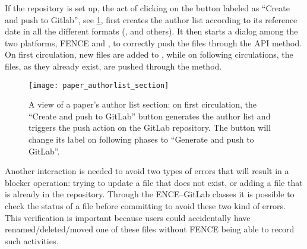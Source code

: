 If the repository is set up, the act of clicking on the button labeled as \enquote{Create and push to Gitlab}, see \cref{fig:paper_authorlist_section},
first creates the author list according to its reference date in all the different formats (,  and others).
It then starts a dialog among the two platforms, FENCE and \gitlab, to correctly push the files through the \gitlab API  method.
On first circulation, new files are added to \gitlab, while on following circulations, the files, as they already exist, are pushed through the  method.

\begin{figure}[htb]
  \centering
  \texttt{[image: paper\_authorlist\_section]}
  \caption{A view of a paper's author list section: on first circulation,
  the \enquote{Create and push to GitLab} button generates the author list and triggers the push action on the GitLab repository.
  The button will change its label on following phases to \enquote{Generate and push to GitLab}.}%
  \label{fig:paper_authorlist_section}
\end{figure}

Another interaction is needed to avoid two types of errors that will result in a blocker operation:
trying to update a file that does not exist, or adding a file that is already in the repository.
Through the ENCE–GitLab classes it is possible to check the status of a file before committing to avoid these two kind of errors.
This verification is important because users could accidentally have renamed/deleted/moved one of these files without FENCE being able to record such activities.
